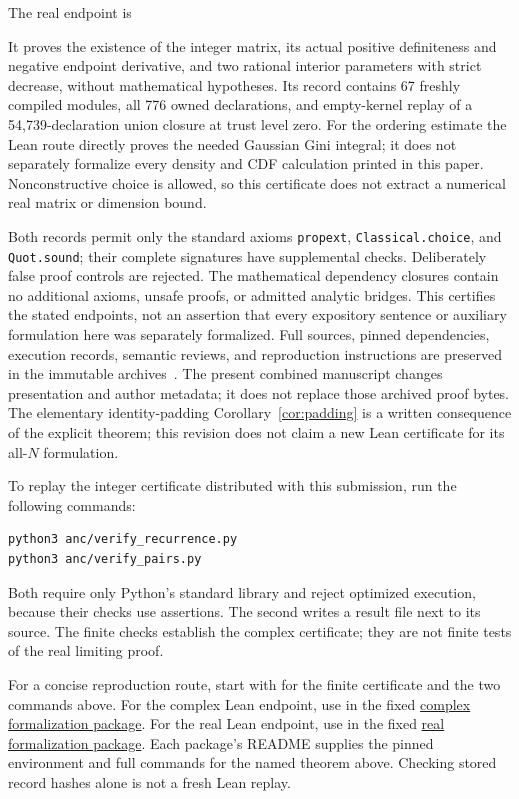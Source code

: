 \documentclass[11pt]{article}
\theoremstyle{remark}
\begin{document}
The real endpoint is
\begin{quote}\small
{}
\end{quote}
It proves the existence of the integer matrix, its actual positive
definiteness and negative endpoint derivative, and two rational
interior parameters with strict decrease, without mathematical
hypotheses. Its record contains 67 freshly compiled modules, all
776 owned declarations, and empty-kernel replay of a
54,739-declaration union closure at trust level zero.
For the ordering estimate the Lean route directly proves the needed
Gaussian Gini integral; it does not separately formalize every
density and CDF calculation printed in this paper. Nonconstructive
choice is allowed, so this certificate does not extract a numerical
real matrix or dimension bound.

Both records permit only the standard axioms \texttt{propext},
\texttt{Classical.choice}, and \texttt{Quot.sound}; their complete
signatures have supplemental checks. Deliberately false proof
controls are rejected. The mathematical dependency closures contain
no additional axioms, unsafe proofs, or admitted analytic bridges.
This certifies the stated endpoints, not an assertion that every
expository sentence or auxiliary formulation here was separately
formalized. Full sources, pinned dependencies, execution records,
semantic reviews, and reproduction instructions are preserved in
the immutable archives~\cite{ComplexLean,RealLean}.
The present combined manuscript changes presentation and author
metadata; it does not replace those archived proof bytes.
The elementary identity-padding Corollary~\ref{cor:padding} is a
written consequence of the explicit theorem; this revision does not
claim a new Lean certificate for its all-$N$ formulation.

To replay the integer certificate distributed with this submission,
run the following commands:
\begin{verbatim}
python3 anc/verify_recurrence.py
python3 anc/verify_pairs.py
\end{verbatim}
Both require only Python's
standard library and reject optimized execution, because their
checks use assertions. The second writes a result file next to its
source. The finite checks establish the complex certificate;
they are not finite tests of the real limiting proof.

For a concise reproduction route, start with  for
the finite certificate and the two commands above. For the complex Lean
endpoint, use  in the fixed
\href{https://github.com/mxym/math/tree/6aa1adcc7897635b4ab2c82b0ae22c23106f91e6/formalizations/bapat-q-permanent-explicit-rational}{complex formalization package}.
For the real Lean endpoint, use  in the fixed
\href{https://github.com/mxym/math/tree/6ff60a4bad0bd78925f29faf8e3b252aa8b3e455/formalizations/bapat-real-symmetric-existence-counterexample}{real formalization package}.
Each package's README supplies the pinned environment and full commands
for the named theorem above. Checking stored record hashes alone is
not a fresh Lean replay.
\end{document}

